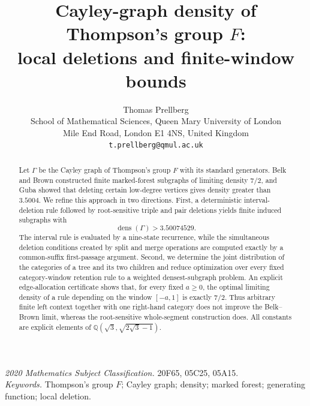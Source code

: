 \documentclass[11pt,a4paper]{article}
\title{Cayley-graph density of Thompson's group $F$:\\local deletions and finite-window bounds}
\author{Thomas Prellberg\\
\small School of Mathematical Sciences, Queen Mary University of London\\
\small Mile End Road, London E1 4NS, United Kingdom\\
\small \texttt{t.prellberg@qmul.ac.uk}}
\date{}
\theoremstyle{definition}
\theoremstyle{remark}
\newcommand{\dens}{\operatorname{dens}}
\newcommand{\Q}{\mathbb Q}
\begin{document}
\maketitle
\begin{abstract}
Let $\Gamma$ be the Cayley graph of Thompson's group $F$ with its standard generators. Belk and Brown constructed finite marked-forest subgraphs of limiting density $7/2$, and Guba showed that deleting certain low-degree vertices gives density greater than $3.5004$. We refine this approach in two directions. First, a deterministic interval-deletion rule followed by root-sensitive triple and pair deletions yields finite induced subgraphs with
\[
\dens(\Gamma)>3.50074529.
\]
The interval rule is evaluated by a nine-state recurrence, while the simultaneous deletion conditions created by split and merge operations are computed exactly by a common-suffix first-passage argument. Second, we determine the joint distribution of the categories of a tree and its two children and reduce optimization over every fixed category-window retention rule to a weighted densest-subgraph problem. An explicit edge-allocation certificate shows that, for every fixed $a\ge0$, the optimal limiting density of a rule depending on the window $[-a,1]$ is exactly $7/2$. Thus arbitrary finite left context together with one right-hand category does not improve the Belk--Brown limit, whereas the root-sensitive whole-segment construction does. All constants are explicit elements of $\Q(\sqrt3,\sqrt{2\sqrt3-1})$.
\end{abstract}
\noindent\emph{2020 Mathematics Subject Classification.} 20F65, 05C25, 05A15.\\
\emph{Keywords.} Thompson's group $F$; Cayley graph; density; marked forest; generating function; local deletion.
\end{document}
